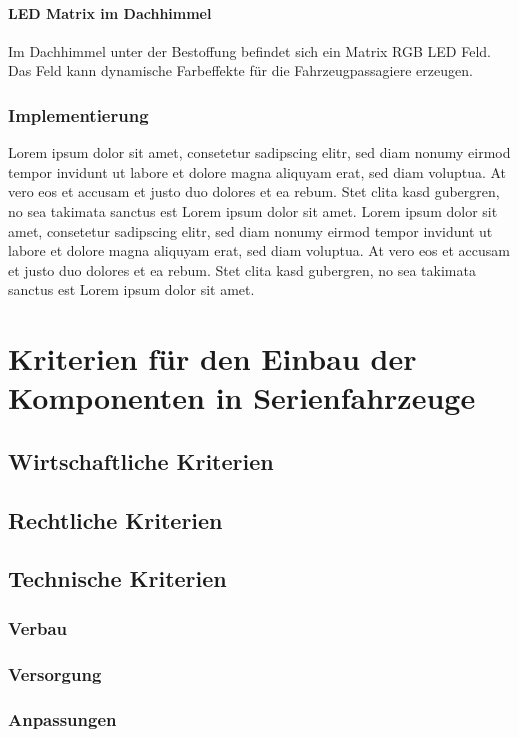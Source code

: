\subsubsection{LED Matrix im Dachhimmel}
Im Dachhimmel unter der Bestoffung befindet sich ein Matrix RGB LED Feld. Das Feld kann dynamische Farbeffekte für die Fahrzeugpassagiere erzeugen.

\subsection{Implementierung}
Lorem ipsum dolor sit amet, consetetur sadipscing elitr, sed diam nonumy eirmod tempor invidunt ut labore et dolore magna aliquyam erat, sed diam voluptua. At vero eos et accusam et justo duo dolores et ea rebum. Stet clita kasd gubergren, no sea takimata sanctus est Lorem ipsum dolor sit amet. Lorem ipsum dolor sit amet, consetetur sadipscing elitr, sed diam nonumy eirmod tempor invidunt ut labore et dolore magna aliquyam erat, sed diam voluptua. At vero eos et accusam et justo duo dolores et ea rebum. Stet clita kasd gubergren, no sea takimata sanctus est Lorem ipsum dolor sit amet.


\chapter{Kriterien für den Einbau der Komponenten in Serienfahrzeuge}
\label{cha:Kriterien}
\section{Wirtschaftliche Kriterien}
\section{Rechtliche Kriterien}
\section{Technische Kriterien}
\subsection{Verbau}
\subsection{Versorgung}
\subsection{Anpassungen}



